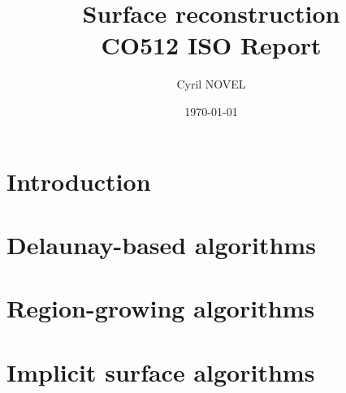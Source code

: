 \documentclass[a4paper]{article}
\title{Surface reconstruction\\
\large{CO512 ISO Report}}
\author{Cyril NOVEL}
\date{\today}
\begin{document}
\maketitle
\newpage
\section{Introduction}


\section{Delaunay-based algorithms}

\section{Region-growing algorithms}

\section{Implicit surface algorithms}
\end{document}
